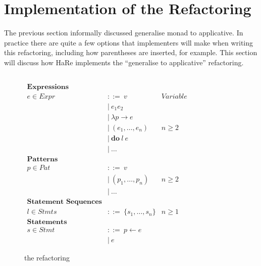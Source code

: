 \section{Implementation of the Refactoring}
\label{sec:refacImp}

The previous section informally discussed \DIFdelbegin {}\DIFdelend \DIFaddbegin {}\DIFaddend generalise monad to applicative\DIFdelbegin {}\DIFdelend \DIFaddbegin {}\DIFaddend . In practice there are quite a few options that implementers will make when writing this refactoring, including how parentheses are inserted, for example. This section will discuss \DIFdelbegin {}\DIFdelend \DIFaddbegin {}\DIFaddend how HaRe implements the ``generalise to applicative'' refactoring.

\DIFdelbegin \subsection{}
\addtocounter{subsection}{-1}%
\DIFdelend \begin{figure}[t]
	\begin{math}
		\begin{aligned}
\textbf{Expressions}\\
e \in Expr\ &::=\ v\qquad &Variable\\
&|\ e_1 e_2\\
&|\ \lambda p \rightarrow e\\
&|\ (e_1, \ldots, e_n) &n \geq 2\\
&|\ \textbf{do}\ l\ e\\
&|\ \ldots\\
\textbf{Patterns}\\
p \in Pat\ &::=\ v\\
&|\ (p_1, \ldots, p_n) &n \geq 2\\
&|\ \ldots \\
\textbf{Statement Sequences}\\
l \in Stmts\ &::=\ \{s_1, \ldots, s_n\} &n \geq 1\\
\textbf{Statements}\\
s \in Stmt\ &::=\ p \leftarrow e\\
&|\ e
		\end{aligned}
	\end{math}
	\caption{\DIFdelbeginFL {}\DIFdelendFL \DIFaddbeginFL {}\DIFaddendFL the refactoring\DIFdelbeginFL {}\DIFdelendFL }
	\label{syntax}
\end{figure}

